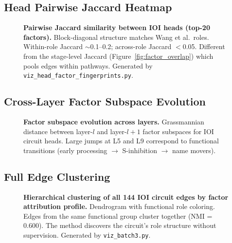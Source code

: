 \documentclass[11pt]{article}
\begin{document}

\subsection{Head Pairwise Jaccard Heatmap}
\label{fig:head_jaccard}

\begin{figure}[h!]
\centering
\caption{\textbf{Pairwise Jaccard similarity between IOI heads (top-20
factors).} Block-diagonal structure matches Wang et al.\ roles.
Within-role Jaccard $\sim$0.1--0.2; across-role Jaccard $<$0.05.
Different from the stage-level Jaccard (Figure~\ref{fig:factor_overlap})
which pools edges within pathways. Generated by
\texttt{viz\_head\_factor\_fingerprints.py}.}
\end{figure}


\subsection{Cross-Layer Factor Subspace Evolution}
\label{fig:cross_layer}

\begin{figure}[h!]
\centering
\caption{\textbf{Factor subspace evolution across layers.} Grassmannian
distance between layer-$l$ and layer-$l+1$ factor subspaces for IOI
circuit heads. Large jumps at L5 and L9 correspond to functional
transitions (early processing $\to$ S-inhibition $\to$ name movers).}
\end{figure}


\subsection{Full Edge Clustering}
\label{fig:full_clustering}

\begin{figure}[h!]
\centering
\caption{\textbf{Hierarchical clustering of all 144 IOI circuit edges
by factor attribution profile.} Dendrogram with functional role
coloring. Edges from the same functional group cluster together
(NMI = 0.600). The method discovers the circuit's role structure
without supervision. Generated by \texttt{viz\_batch3.py}.}
\end{figure}
\end{document}
